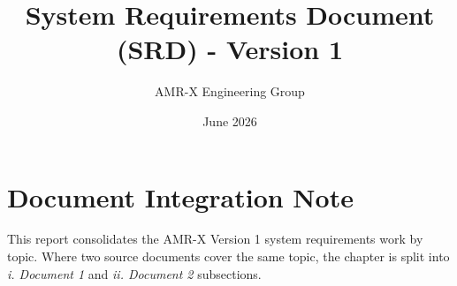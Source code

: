 \documentclass[12pt,a4paper]{report}
\title{System Requirements Document (SRD) - Version 1}
\author{AMR-X Engineering Group}
\date{June 2026}
\begin{document}
\hypersetup{pageanchor=false}
\maketitle
{}

\newpage

\tableofcontents
\clearpage
{}
\hypersetup{pageanchor=true}

\chapter*{Document Integration Note}

This report consolidates the AMR-X Version 1 system requirements work by topic. Where two source documents cover the same topic, the chapter is split into \textit{i. Document 1} and \textit{ii. Document 2} subsections.










\end{document}
